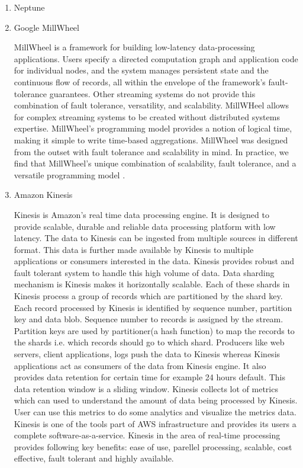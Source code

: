 \begin{enumerate}
\item {} 
Neptune

\item {} 
Google MillWheel

MillWheel is a framework for building low-latency data-processing
applications. Users specify a directed computation graph and
application code for individual nodes, and the system manages
persistent state and the continuous flow of records, all within
the envelope of the framework’s fault-tolerance guarantees. Other
streaming systems do not provide this combination of fault
tolerance, versatility, and scalability. MillWHeel allows for
complex streaming systems to be created without distributed
systems expertise. MillWheel’s programming model provides a
notion of logical time, making it simple to write time-based
aggregations. MillWheel was designed from the outset with fault
tolerance and scalability in mind. In practice, we find that
MillWheel’s unique combination of scalability, fault tolerance,
and a versatile programming model \label{\detokenize{i524/technologies:id268}}{\hyperref[\detokenize{i524/technologies:millwheel-paper}]{\sphinxcrossref{{[}223{]}}}}.

\item {} 
Amazon Kinesis

Kinesis is Amazon’s \label{\detokenize{i524/technologies:id269}}{\hyperref[\detokenize{i524/technologies:www-kinesis}]{\sphinxcrossref{{[}224{]}}}} real time data processing
engine. It is designed to provide scalable, durable and reliable
data processing platform with low latency. The data to Kinesis
can be ingested from multiple sources in different format. This
data is further made available by Kinesis to multiple
applications or consumers interested in the data. Kinesis
provides robust and fault tolerant system to handle this high
volume of data. Data sharding mechanism is Kinesis makes it
horizontally scalable. Each of these shards in Kinesis process a
group of records which are partitioned by the shard key. Each
record processed by Kinesis is identified by sequence number,
partition key and data blob. Sequence number to records is
assigned by the stream. Partition keys are used by partitioner(a
hash function) to map the records to the shards i.e. which
records should go to which shard. Producers like web servers,
client applications, logs push the data to Kinesis whereas
Kinesis applications act as consumers of the data from Kinesis
engine. It also provides data retention for certain time for
example 24 hours default. This data retention window is a sliding
window. Kinesis collects lot of metrics which can used to
understand the amount of data being processed by Kinesis.  User
can use this metrics to do some analytics and visualize the
metrics data.  Kinesis is one of the tools part of AWS
infrastructure and provides its users a complete
software-as-a-service. Kinesis \label{\detokenize{i524/technologies:id270}}{\hyperref[\detokenize{i524/technologies:big-data-analytics-book}]{\sphinxcrossref{{[}225{]}}}} in
the area of real-time processing provides following key benefits:
ease of use, parellel processing, scalable, cost effective, fault
tolerant and highly available.


\end{enumerate}
